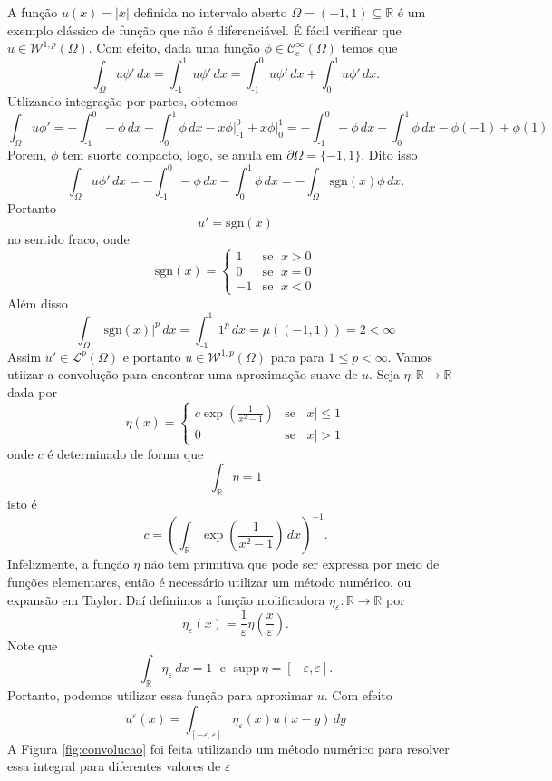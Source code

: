 \documentclass[a4paper, 11pt]{book}
\theoremstyle{definition}
\newcommand{\m}{\text{-}}
\newcommand{\bR}{\mathbb{R}}
\newcommand{\cC}{\mathcal{C}}
\newcommand{\cL}{\mathcal{L}}
\newcommand{\cW}{\mathcal{W}}
\newcommand{\supp}{\mathrm{supp}\,}
\newcommand{\sgn}{\mathrm{sgn}}
\begin{document}
\begin{ex}
    A função $u(x) = |x|$ definida no intervalo aberto $\Omega = (-1,1) \subseteq \bR$ é um exemplo clássico de função que não é diferenciável. É fácil verificar que $u \in \cW^{1,p}(\Omega)$. Com efeito, dada uma função $\phi \in \cC^\infty_c(\Omega)$ temos que
    \[
        \int_\Omega u \phi' \,dx = \int_{\text{-}1}^1 u \phi' \,dx = \int_{\text{-}1}^0 u \phi' \,dx + \int_0^1 u \phi' \,dx.
    \]
    Utlizando integração por partes, obtemos
    \[
        \int_\Omega u \phi' =  - \int_{\m1}^0 -\phi \,dx  - \int_0^1 \phi \,dx -x \phi \bigg|^{0}_{\m1}+ x\phi \bigg|_0^1 = -\int_{\m1}^{0} - \phi \,dx -\int_0^1 \phi \,dx - \phi(-1) + \phi(1)
    \]
    Porem, $\phi$ tem suorte compacto, logo, se anula em $\partial\Omega = \{-1,1\}$. Dito isso
    \[
        \int_\Omega u \phi'\,dx = - \int_{\text{-}1}^0 -\phi \,dx - \int_0^1 \phi \,dx = -\int_\Omega \sgn(x)\phi \,dx.
    \]
    Portanto
    \[
        u'= \sgn(x)
    \]
    no sentido fraco, onde
    \[
        \sgn(x) = 
        \left\{ 
            \begin{array}{rr}
                1 & \text{se }\; x > 0\\
                0 & \text{se }\; x = 0\\
                -1& \text{se }\; x < 0
            \end{array}
        \right.
    \]
    Além disso
    \[
        \int_\Omega |\sgn(x)|^p \,dx = \int_{\text{-}1}^1 1^p \,dx =  \mu((-1,1)) = 2 < \infty
    \]
    Assim $u'\in \cL^p(\Omega)$ e portanto $u \in \cW^{1,p}(\Omega)$ para para $1 \leqslant p < \infty$.
    Vamos utiizar a convolução para encontrar uma aproximação suave de $u$. 
    Seja $\eta : \bR \to \bR$ dada por
    \[
        \eta(x) = \left\{ 
            \begin{array}{lr}
                c \exp\left(\frac{1}{x^2 - 1} \right) & \text{se }\; |x| \leqslant 1\\
                0 & \text{se }\; |x| > 1
            \end{array}
        \right.
    \]
    onde $c$ é determinado de forma que
    \[
        \int_{\bR} \eta = 1
    \]
    isto é
    \[
        c = \left( \int_\bR \exp \left(\frac{1}{x^2 - 1} \right) \, dx\right)^{-1}.
    \]
    Infelizmente, a função $\eta$ não tem primitiva que pode ser expressa por meio de funções elementares, então é necessário utilizar um método numérico, ou expansão em Taylor.
    Daí definimos a função molificadora $\eta_\varepsilon : \bR \to \bR$ por
    \[
        \eta_\varepsilon(x) = \frac{1}{\varepsilon} \eta\left( \frac{x}{\varepsilon} \right).
    \]
    Note que
    \[
        \int_\bR \eta_\varepsilon \, dx = 1 \;\text{ e }\; \supp \eta = [-\varepsilon,\varepsilon].
    \]
    Portanto, podemos utilizar essa função para aproximar $u$. Com efeito
    \[
        u^\varepsilon(x) = \int_{[-\varepsilon,\varepsilon]} \eta_\varepsilon(x) u(x-y) \,dy
    \]
    A Figura \ref{fig:convolucao} foi feita utilizando um método numérico para resolver essa integral para diferentes valores de $\varepsilon$ 


\end{ex}
\end{document}
